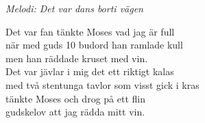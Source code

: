{\footnotesize\textit{Melodi: Det var dans borti vägen}}\par
\vspace{10pt}
Det var fan tänkte Moses vad jag är full\\
när med guds 10 budord han ramlade kull\\
men han räddade kruset med vin.\\
Det var jävlar i mig det ett riktigt kalas\\
med två stentunga tavlor som visst gick i kras\\
tänkte Moses och drog på ett flin\\
gudskelov att jag rädda mitt vin.
